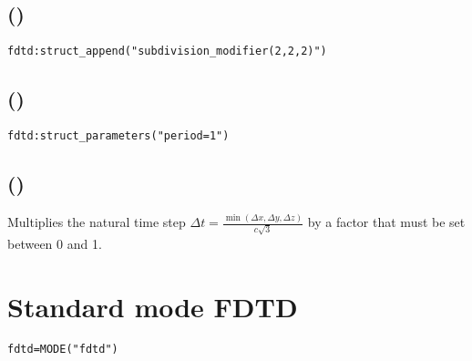 \subsection[struct\_append]{()}

	\fwarn
\begin{lstlisting}
fdtd:struct_append("subdivision_modifier(2,2,2)")
\end{lstlisting}


\subsection[struct\_parameters]{()}

\fwarn
\begin{lstlisting}
fdtd:struct_parameters("period=1")
\end{lstlisting}


\subsection[time\_mod]{()}

Multiplies the natural time step $\Delta t=\frac{\min(\Delta x,\Delta y,\Delta z)}{c\sqrt{3}}$ by a factor  that must be set between 0 and 1.

\section{Standard mode FDTD}

\fwarn
\begin{lstlisting}
fdtd=MODE("fdtd")
\end{lstlisting}

